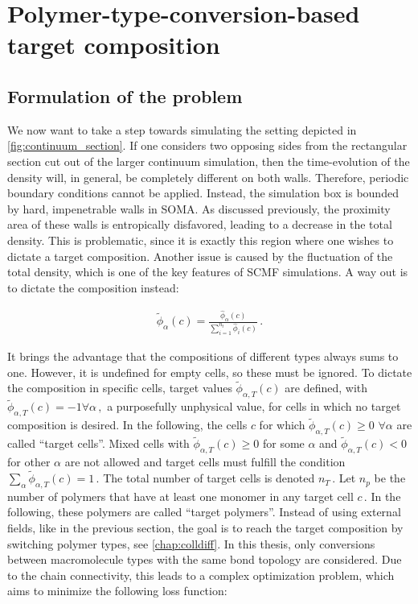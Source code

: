 \documentclass[bachelor,       %
               oneside,        %
               BCOR10mm,       %
               ngerman, english %
               ]{GAUBM}
\begin{document}
\chapter{Polymer-type-conversion-based target composition}
\label{chap:polyconversion}

\section{Formulation of the problem}
We now want to take a step towards simulating the setting depicted in \autoref{fig:continuum_section}. If one considers two opposing sides from the rectangular section cut out of the larger continuum simulation, then the time-evolution of the density will, in general, be completely different on both walls. Therefore, periodic boundary conditions cannot be applied. Instead, the simulation box is bounded by hard, impenetrable walls in \ac{SOMA}. As discussed previously, the proximity area of these walls is entropically disfavored, leading to a decrease in the total density. This is problematic, since it is exactly this region where one wishes to dictate a target composition. Another issue is caused by the fluctuation of the total density, which is one of the key features of \ac{SCMF} simulations. A way out is to dictate the composition instead:

\begin{align}
    \tilde\phi_\alpha(c)=\frac{\hat\phi_\alpha(c)}{\sum_{i=1}^{n_t}\hat\phi_i(c)}\,.
\end{align}

It brings the advantage that the compositions of different types always sums to one. However, it is undefined for empty cells, so these must be ignored. To dictate the composition in specific cells, target values $\tilde\phi_{\alpha,T}(c)$ are defined, with $\tilde\phi_{\alpha,T}(c)=-1\forall\alpha\,,$ a purposefully unphysical value, for cells in which no target composition is desired. In the following, the cells $c$ for which $\tilde\phi_{\alpha,T}(c)\ge 0$ $\forall\alpha$ are called \enquote{target cells}. Mixed cells with $\tilde\phi_{\alpha,T}(c)\ge 0$ for some $\alpha$ and $\tilde\phi_{\alpha,T}(c)<0$ for other $\alpha$ are not allowed and target cells must fulfill the condition $\sum_\alpha\tilde\phi_{\alpha,T}(c)=1\, .$ The total number of target cells is denoted $n_T\,.$ Let $n_p$ be the number of polymers that have at least one monomer in any target cell $c\,.$ In the following, these polymers are called \enquote{target polymers}. Instead of using external fields, like in the previous section, the goal is to reach the target composition by switching polymer types, see \autoref{chap:colldiff}. In this thesis, only conversions between macromolecule types with the same bond topology are considered. Due to the chain connectivity, this leads to a complex optimization problem, which aims to minimize the following loss function:
\end{document}
